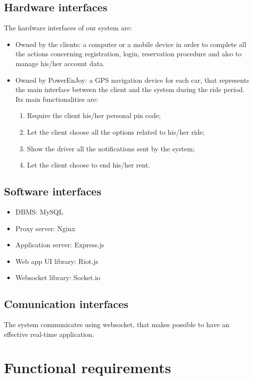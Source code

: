 \subsection{Hardware interfaces}
The hardware interfaces of our system are:
\begin{itemize}
\item Owned by the clients: a computer or a mobile device in order to complete all the actions concerning registration, login, reservation procedure and also to manage his/her account data.
\item Owned by PowerEnJoy: a GPS navigation device for each car, that represents the main interface between the client and the system during the ride period.
Its main functionalities are:
\begin{enumerate}
\item Require the client his/her personal pin code;
\item Let the client choose all the options related to his/her ride;
\item Show the driver all the notifications sent by the system;
\item Let the client choose to end his/her rent.
\end{enumerate}
\end{itemize}
\subsection{Software interfaces}
\begin{itemize}
\item DBMS: MySQL
\item Proxy server: Nginx
\item Application server: Express.js
\item Web app UI library: Riot.js
\item Websocket library: Socket.io
\end{itemize}
\subsection{Comunication interfaces}
The system communicates using websocket, that makes possible to have an effective real-time application.

\section{Functional requirements}

